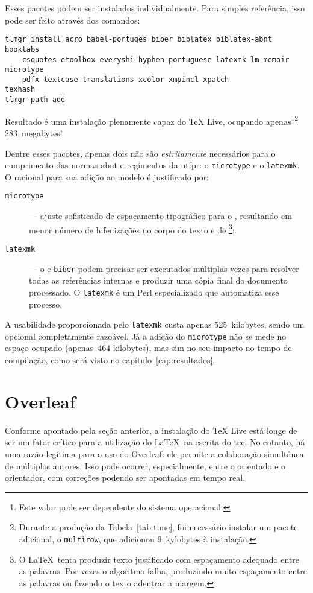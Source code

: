 Esses pacotes podem ser instalados individualmente. Para simples referência, isso pode ser feito através dos comandos:
\begin{verbatim}
tlmgr install acro babel-portuges biber biblatex biblatex-abnt booktabs
	csquotes etoolbox everyshi hyphen-portuguese latexmk lm memoir microtype
	pdfx textcase translations xcolor xmpincl xpatch
texhash
tlmgr path add
\end{verbatim}
Resultado é uma instalação plenamente capaz do TeX Live, ocupando apenas\footnote{Este valor pode ser dependente do sistema operacional.}\footnote{Durante a produção da Tabela~\ref{tab:time}, foi necessário instalar um pacote adicional, o \texttt{multirow}, que adicionou 9~kylobytes à instalação.} 283~megabytes!

Dentre esses pacotes, apenas dois não são \emph{estritamente} necessários para o cumprimento das normas \ac{abnt} e regimentos da \ac{utfpr}: o \texttt{microtype} e o \texttt{latexmk}. O racional para sua adição ao modelo é justificado por:
\begin{description}
	\item[\texttt{microtype}] --- ajuste sofisticado de espaçamento tipográfico para o \pdftex, resultando em menor número de hifenizações no corpo do texto e de \footnote{O \LaTeX\ tenta produzir texto justificado com espaçamento adequado entre as palavras. Por vezes o algoritmo falha, produzindo muito espaçamento entre as palavras ou fazendo o texto adentrar a margem.};
	\item[\texttt{latexmk}] --- o \pdftex e \texttt{biber} podem precisar ser executados múltiplas vezes para resolver todas as referências internas e produzir uma cópia final do documento processado. O \texttt{latexmk} é um  Perl especializado que automatiza esse processo.
\end{description}

A usabilidade proporcionada pelo \texttt{latexmk} custa apenas 525~kilobytes, sendo um opcional completamente razoável. Já a adição do \texttt{microtype} não se mede no espaço ocupado (apenas~464 kilobytes), mas sim no seu impacto no tempo de compilação, como será visto no capítulo~\ref{cap:resultados}.

\section{Overleaf}

Conforme apontado pela seção anterior, a instalação do TeX Live está longe de ser um fator crítico para a utilização do \LaTeX\ na escrita do \ac{tcc}. No entanto, há uma razão legítima para o uso do Overleaf: ele permite a colaboração simultânea de múltiplos autores. Isso pode ocorrer, especialmente, entre o orientado e o orientador, com correções podendo ser apontadas em tempo real.

